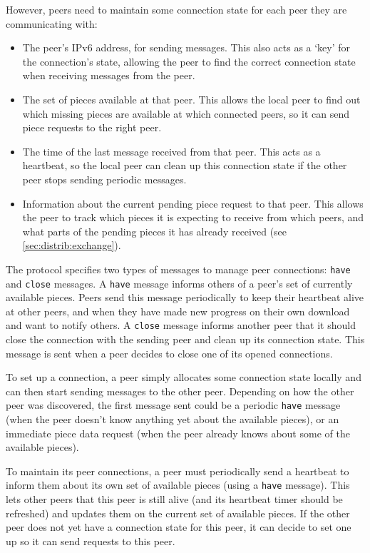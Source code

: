 However, peers need to maintain some connection state for each peer they are communicating with:
\begin{itemize}
\item The peer's \gls{IPv6} address, for sending messages. This also acts as a `key' for the connection's state, allowing the peer to find the correct connection state when receiving messages from the peer.
\item The set of pieces available at that peer. This allows the local peer to find out which missing pieces are available at which connected peers, so it can send piece requests to the right peer.
\item The time of the last message received from that peer. This acts as a heartbeat, so the local peer can clean up this connection state if the other peer stops sending periodic messages.
\item Information about the current pending piece request to that peer. This allows the peer to track which pieces it is expecting to receive from which peers, and what parts of the pending pieces it has already received (see \ref{sec:distrib:exchange}).
\end{itemize}

The protocol specifies two types of messages to manage peer connections: \texttt{have} and \texttt{close} messages. A \texttt{have} message informs others of a peer's set of currently available pieces. Peers send this message periodically to keep their heartbeat alive at other peers, and when they have made new progress on their own download and want to notify others. A \texttt{close} message informs another peer that it should close the connection with the sending peer and clean up its connection state. This message is sent when a peer decides to close one of its opened connections.

To set up a connection, a peer simply allocates some connection state locally and can then start sending messages to the other peer. Depending on how the other peer was discovered, the first message sent could be a periodic \texttt{have} message (when the peer doesn't know anything yet about the available pieces), or an immediate piece data request (when the peer already knows about some of the available pieces).

To maintain its peer connections, a peer must periodically send a heartbeat to inform them about its own set of available pieces (using a \texttt{have} message). This lets other peers that this peer is still alive (and its heartbeat timer should be refreshed) and updates them on the current set of available pieces. If the other peer does not yet have a connection state for this peer, it can decide to set one up so it can send requests to this peer.

